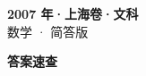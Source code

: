 \documentclass[zihao=-4, a4paper]{ctexart}
\begin{document}
\begin{center}
  {\Large\bfseries 2007 年·上海卷·文科}\\[4pt]
  {\large 数学 · 简答版}
\end{center}
\medskip
{}

\clearpage
{}
\begin{center}{\Large\bfseries 答案速查}\end{center}
\medskip

\end{document}
